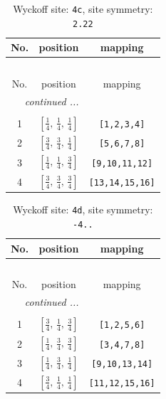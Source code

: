 \documentclass[fleqn,8pt]{jsarticle}
\begin{document}
\renewcommand{\arraystretch}{1.2}
\begin{longtable}{ccc}
\caption{Wyckoff site: {\tt 4c}, site symmetry: {\tt 2.22}}
 \\
 \hline \hline
No. & position & mapping \\ \hline \endfirsthead

\multicolumn{2}{l}{\tablename\ \thetable{}} \\
 \hline \hline
No. & position & mapping \\ \hline \endhead

 \hline \hline
\multicolumn{2}{r}{\footnotesize\it continued ...} \\ \endfoot

 \hline \hline
\multicolumn{2}{r}{} \\ \endlastfoot

1 & $\left[ \frac{1}{4},\, \frac{1}{4},\, \frac{1}{4} \right]$ & {\tt [1,2,3,4]} \\ \hline
2 & $\left[ \frac{3}{4},\, \frac{3}{4},\, \frac{1}{4} \right]$ & {\tt [5,6,7,8]} \\ \hline
3 & $\left[ \frac{1}{4},\, \frac{1}{4},\, \frac{3}{4} \right]$ & {\tt [9,10,11,12]} \\ \hline
4 & $\left[ \frac{3}{4},\, \frac{3}{4},\, \frac{3}{4} \right]$ & {\tt [13,14,15,16]} \\
\end{longtable}
\renewcommand{\arraystretch}{1.2}
\begin{longtable}{ccc}
\caption{Wyckoff site: {\tt 4d}, site symmetry: {\tt -4..}}
 \\
 \hline \hline
No. & position & mapping \\ \hline \endfirsthead

\multicolumn{2}{l}{\tablename\ \thetable{}} \\
 \hline \hline
No. & position & mapping \\ \hline \endhead

 \hline \hline
\multicolumn{2}{r}{\footnotesize\it continued ...} \\ \endfoot

 \hline \hline
\multicolumn{2}{r}{} \\ \endlastfoot

1 & $\left[ \frac{3}{4},\, \frac{1}{4},\, \frac{3}{4} \right]$ & {\tt [1,2,5,6]} \\ \hline
2 & $\left[ \frac{1}{4},\, \frac{3}{4},\, \frac{3}{4} \right]$ & {\tt [3,4,7,8]} \\ \hline
3 & $\left[ \frac{1}{4},\, \frac{3}{4},\, \frac{1}{4} \right]$ & {\tt [9,10,13,14]} \\ \hline
4 & $\left[ \frac{3}{4},\, \frac{1}{4},\, \frac{1}{4} \right]$ & {\tt [11,12,15,16]} \\
\end{longtable}
\end{document}
